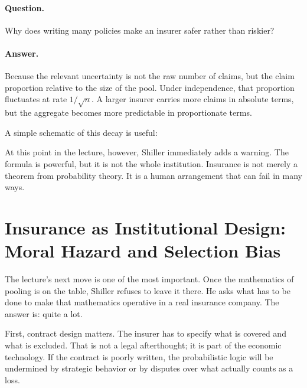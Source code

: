 \paragraph{Question.} Why does writing many policies make an insurer safer rather than riskier?

\paragraph{Answer.} Because the relevant uncertainty is not the raw number of claims, but the claim proportion relative to the size of the pool. Under independence, that proportion fluctuates at rate \(1/\sqrt{n}\). A larger insurer carries more claims in absolute terms, but the aggregate becomes more predictable in proportionate terms.

A simple schematic of this decay is useful:

\begin{figure}
\centering
{}
\end{figure}

At this point in the lecture, however, Shiller immediately adds a warning. The formula is powerful, but it is not the whole institution. Insurance is not merely a theorem from probability theory. It is a human arrangement that can fail in many ways.

\section{Insurance as Institutional Design: Moral Hazard and Selection Bias}

The lecture's next move is one of the most important. Once the mathematics of pooling is on the table, Shiller refuses to leave it there. He asks what has to be done to make that mathematics operative in a real insurance company. The answer is: quite a lot.

First, contract design matters. The insurer has to specify what is covered and what is excluded. That is not a legal afterthought; it is part of the economic technology. If the contract is poorly written, the probabilistic logic will be undermined by strategic behavior or by disputes over what actually counts as a loss.

